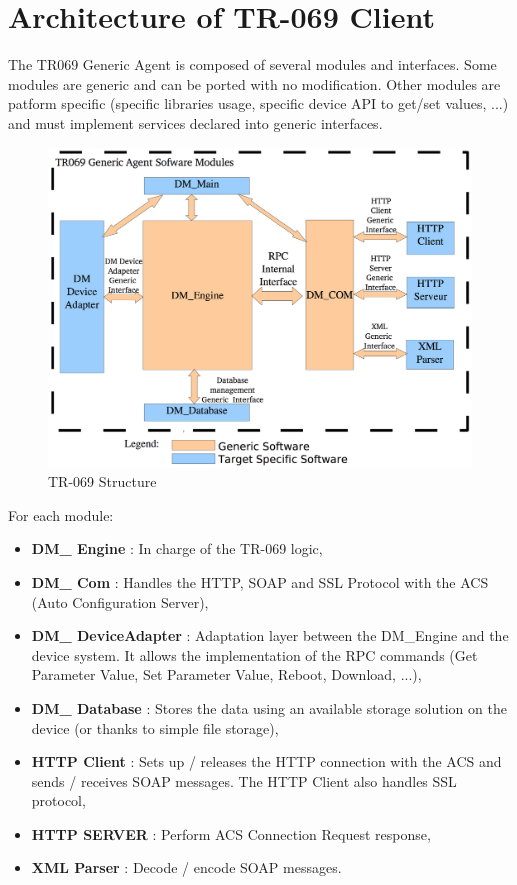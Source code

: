 \section{Architecture of TR-069 Client}
The TR069 Generic Agent is composed of several modules and interfaces. Some modules are generic and can be ported with no modification. Other modules are patform specific (specific libraries usage, specific device API to get/set values, ...) and must implement services declared into generic interfaces.

\begin{figure}[htbp]
	\centering
		\includegraphics[width=12cm]{Figures/structuretr069.png}
	\caption[TR-069 Structure]{TR-069 Structure}
	\label{fig:tr069}
\end{figure}

For each module:
\begin{itemize}
  \item \textbf{DM\_ Engine} : In charge of the TR-069 logic,
  \item \textbf{DM\_ Com} : Handles the HTTP, SOAP and SSL Protocol with the ACS (Auto Configuration Server),
  \item \textbf{DM\_ DeviceAdapter} : Adaptation layer between the DM_Engine and the device system. It allows the implementation of the RPC commands (Get Parameter Value, Set Parameter Value, Reboot, Download, ...),
  \item \textbf{DM\_ Database} : Stores the data using an available storage solution on the device (or thanks to simple file storage),
  \item \textbf{HTTP Client} : Sets up / releases the HTTP connection with the ACS and sends / receives SOAP messages. The HTTP Client also handles SSL protocol,
  \item \textbf{HTTP SERVER} : Perform ACS Connection Request response,
  \item \textbf{XML Parser} : Decode / encode SOAP messages.
\end{itemize}

